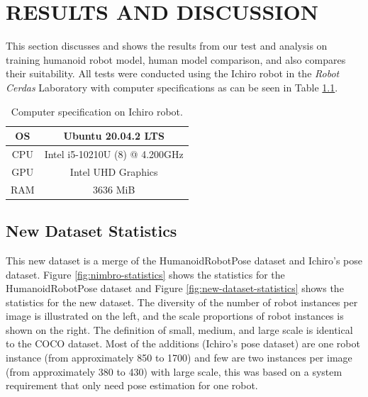 \chapter{RESULTS AND DISCUSSION}
\label{chap:resultsandiscussion}


This section discusses and shows the results from our test and analysis on training humanoid robot model, human model comparison, and also compares their suitability.
All tests were conducted using the Ichiro robot in the \emph{Robot Cerdas} Laboratory with computer specifications as can be seen in Table \ref{tb:computerspecichiro}.

\def\arraystretch{1.5}
\begin{longtable}{|c|c|}
  \caption{Computer specification on Ichiro robot.}
  \label{tb:computerspecichiro}\\
  \hline
  OS      & Ubuntu 20.04.2 LTS \\
  \hline
  CPU     & Intel i5-10210U (8) @ 4.200GHz \\
  \hline
  GPU     & Intel UHD Graphics  \\
  \hline
  RAM     & 3636 MiB \\
  \hline
\end{longtable}


\section{New Dataset Statistics}
\label{sec:new-dataset-statistics}

This new dataset is a merge of the HumanoidRobotPose dataset and Ichiro's pose dataset. Figure \ref{fig:nimbro-statistics} shows the statistics for the HumanoidRobotPose dataset and Figure \ref{fig:new-dataset-statistics} shows the statistics for the new dataset.
The diversity of the number of robot instances per image is illustrated on the left, and the scale proportions of robot instances is shown on the right. The definition of small, medium, and large scale is identical to the COCO dataset.
Most of the additions (Ichiro's pose dataset) are one robot instance (from approximately 850 to 1700) and few are two instances per image (from approximately 380 to 430) with large scale, this was based on a system requirement that only need pose estimation for one robot.

